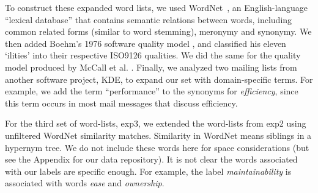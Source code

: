 \documentclass[]{sig-alternate}
\begin{document}
To construct these expanded word lists, we used WordNet~\cite{Fellbaum1998}, an English-language ``lexical database'' that contains semantic relations between words, including common related forms (similar to word stemming), meronymy and synonymy. 
We then added Boehm's 1976 software quality model \cite{Boehm+:1976:ICSE}, and classified his eleven `ilities' into their respective ISO9126 qualities. 
We did the same for the quality model produced by McCall et al. \cite{mccall1977}. 
Finally, we analyzed two mailing lists from another software project, KDE, to expand our set with domain-specific terms. 
For example, we add the term ``performance'' to the synonyms for \emph{efficiency}, since this term occurs in most mail messages that discuss efficiency.

For the third set of word-lists,  \textsf{exp3}, we extended the word-lists from \textsf{exp2} using unfiltered WordNet similarity matches. 
Similarity in WordNet means siblings in a hypernym tree. 
We do not include these words here for space considerations (but see the Appendix for our data repository). 
It is not clear the words associated with our labels are specific enough. For example, the label \emph{maintainability} is associated with words \emph{ease} and \emph{ownership}.
\end{document}
